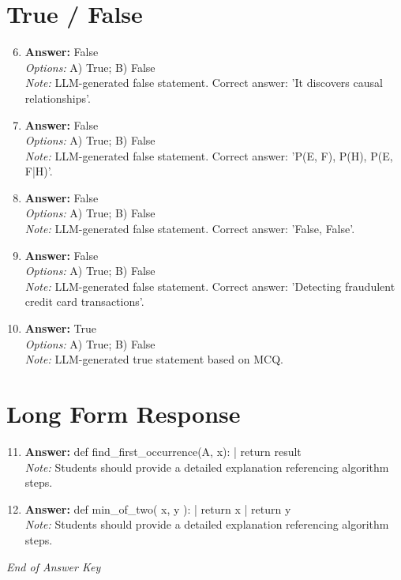 \documentclass[12pt]{article}
\begin{document}
\section*{True / False}
\begin{enumerate}[label=\arabic*.]
\setcounter{enumi}{5}
\item \textbf{Answer:} False
\\ \textit{Options:} A) True; B) False
\\ \textit{Note:} LLM-generated false statement. Correct answer: 'It discovers causal relationships'.
\item \textbf{Answer:} False
\\ \textit{Options:} A) True; B) False
\\ \textit{Note:} LLM-generated false statement. Correct answer: 'P(E, F), P(H), P(E, F|H)'.
\item \textbf{Answer:} False
\\ \textit{Options:} A) True; B) False
\\ \textit{Note:} LLM-generated false statement. Correct answer: 'False, False'.
\item \textbf{Answer:} False
\\ \textit{Options:} A) True; B) False
\\ \textit{Note:} LLM-generated false statement. Correct answer: 'Detecting fraudulent credit card transactions'.
\item \textbf{Answer:} True
\\ \textit{Options:} A) True; B) False
\\ \textit{Note:} LLM-generated true statement based on MCQ.
\end{enumerate}

\section*{Long Form Response}
\begin{enumerate}[label=\arabic*.]
\setcounter{enumi}{10}
\item \textbf{Answer:} def find\_first\_occurrence(A, x): | return result
\\ \textit{Note:} Students should provide a detailed explanation referencing algorithm steps.
\item \textbf{Answer:} def min\_of\_two( x, y ): | return x | return y
\\ \textit{Note:} Students should provide a detailed explanation referencing algorithm steps.
\end{enumerate}

\vfill
\noindent\textit{End of Answer Key}
\end{document}
